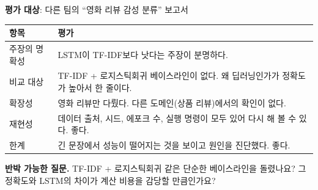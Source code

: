 \documentclass[11pt]{article}
\begin{document}


\noindent\textbf{평가 대상}: 다른 팀의 ``영화 리뷰 감성 분류'' 보고서

\begin{center}\small
\begin{tabular}{@{}p{3.4cm}p{9cm}@{}}\toprule
항목 & 평가 \\\midrule
주장의 명확성 & LSTM이 TF-IDF보다 낫다는 주장이 분명하다. \\
비교 대상 & TF-IDF + 로지스틱회귀 베이스라인이 없다. 왜 딥러닝인가가 정확도가 높아서 한 줄이다. \\
확장성 & 영화 리뷰만 다뤘다. 다른 도메인(상품 리뷰)에서의 확인이 없다. \\
재현성 & 데이터 출처, 시드, 에포크 수, 실행 명령이 모두 있어 다시 해 볼 수 있다. 좋다. \\
한계 & 긴 문장에서 성능이 떨어지는 것을 보이고 원인을 진단했다. 좋다. \\
\bottomrule\end{tabular}\end{center}

\noindent\textbf{반박 가능한 질문.} TF-IDF + 로지스틱회귀 같은 단순한 베이스라인을 돌렸나요? 그 정확도와 LSTM의 차이가 계산 비용을 감당할 만큼인가요?
\end{document}
